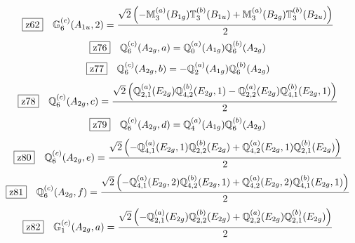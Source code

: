 \documentclass[fleqn,10pt,landscape]{jsarticle}
\begin{document}
\begin{dmath*}
\hspace*{3mm}\fbox{z62}\quad \mathbb{G}_{6}^{(c)}(A_{1u},2)=\frac{\sqrt{2} \left(- \mathbb{M}_{3}^{(a)}(B_{1g}) \mathbb{T}_{3}^{(b)}(B_{1u}) + \mathbb{M}_{3}^{(a)}(B_{2g}) \mathbb{T}_{3}^{(b)}(B_{2u})\right)}{2}
\end{dmath*}
\begin{dmath*}
\hspace*{3mm}\fbox{z76}\quad \mathbb{Q}_{6}^{(c)}(A_{2g},a)=\mathbb{Q}_{0}^{(a)}(A_{1g}) \mathbb{Q}_{6}^{(b)}(A_{2g})
\end{dmath*}
\begin{dmath*}
\hspace*{3mm}\fbox{z77}\quad \mathbb{Q}_{6}^{(c)}(A_{2g},b)=- \mathbb{Q}_{2}^{(a)}(A_{1g}) \mathbb{Q}_{6}^{(b)}(A_{2g})
\end{dmath*}
\begin{dmath*}
\hspace*{3mm}\fbox{z78}\quad \mathbb{Q}_{6}^{(c)}(A_{2g},c)=\frac{\sqrt{2} \left(\mathbb{Q}_{2,1}^{(a)}(E_{2g}) \mathbb{Q}_{4,2}^{(b)}(E_{2g},1) - \mathbb{Q}_{2,2}^{(a)}(E_{2g}) \mathbb{Q}_{4,1}^{(b)}(E_{2g},1)\right)}{2}
\end{dmath*}
\begin{dmath*}
\hspace*{3mm}\fbox{z79}\quad \mathbb{Q}_{6}^{(c)}(A_{2g},d)=\mathbb{Q}_{4}^{(a)}(A_{1g}) \mathbb{Q}_{6}^{(b)}(A_{2g})
\end{dmath*}
\begin{dmath*}
\hspace*{3mm}\fbox{z80}\quad \mathbb{Q}_{6}^{(c)}(A_{2g},e)=\frac{\sqrt{2} \left(- \mathbb{Q}_{4,1}^{(a)}(E_{2g},1) \mathbb{Q}_{2,2}^{(b)}(E_{2g}) + \mathbb{Q}_{4,2}^{(a)}(E_{2g},1) \mathbb{Q}_{2,1}^{(b)}(E_{2g})\right)}{2}
\end{dmath*}
\begin{dmath*}
\hspace*{3mm}\fbox{z81}\quad \mathbb{Q}_{6}^{(c)}(A_{2g},f)=\frac{\sqrt{2} \left(- \mathbb{Q}_{4,1}^{(a)}(E_{2g},2) \mathbb{Q}_{4,2}^{(b)}(E_{2g},1) + \mathbb{Q}_{4,2}^{(a)}(E_{2g},2) \mathbb{Q}_{4,1}^{(b)}(E_{2g},1)\right)}{2}
\end{dmath*}
\begin{dmath*}
\hspace*{3mm}\fbox{z82}\quad \mathbb{G}_{1}^{(c)}(A_{2g},a)=\frac{\sqrt{2} \left(- \mathbb{Q}_{2,1}^{(a)}(E_{2g}) \mathbb{Q}_{2,2}^{(b)}(E_{2g}) + \mathbb{Q}_{2,2}^{(a)}(E_{2g}) \mathbb{Q}_{2,1}^{(b)}(E_{2g})\right)}{2}
\end{dmath*}
\end{document}
